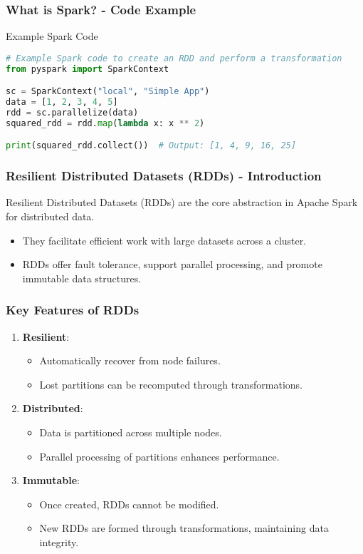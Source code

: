\documentclass[aspectratio=169]{beamer}
\begin{document}
\begin{frame}[fragile]
    \frametitle{What is Spark? - Code Example}
    \begin{block}{Example Spark Code}
        \begin{lstlisting}[language=Python]
# Example Spark code to create an RDD and perform a transformation
from pyspark import SparkContext

sc = SparkContext("local", "Simple App")
data = [1, 2, 3, 4, 5]
rdd = sc.parallelize(data)
squared_rdd = rdd.map(lambda x: x ** 2)

print(squared_rdd.collect())  # Output: [1, 4, 9, 16, 25]
        \end{lstlisting}
    \end{block}
\end{frame}

\begin{frame}[fragile]
    \frametitle{Resilient Distributed Datasets (RDDs) - Introduction}
    Resilient Distributed Datasets (RDDs) are the core abstraction in Apache Spark for distributed data. 
    \begin{itemize}
        \item They facilitate efficient work with large datasets across a cluster.
        \item RDDs offer fault tolerance, support parallel processing, and promote immutable data structures.
    \end{itemize}
\end{frame}

\begin{frame}[fragile]
    \frametitle{Key Features of RDDs}
    \begin{enumerate}
        \item \textbf{Resilient}:
            \begin{itemize}
                \item Automatically recover from node failures.
                \item Lost partitions can be recomputed through transformations.
            \end{itemize}
        
        \item \textbf{Distributed}:
            \begin{itemize}
                \item Data is partitioned across multiple nodes.
                \item Parallel processing of partitions enhances performance.
            \end{itemize}
        
        \item \textbf{Immutable}:
            \begin{itemize}
                \item Once created, RDDs cannot be modified.
                \item New RDDs are formed through transformations, maintaining data integrity.
            \end{itemize}
    \end{enumerate}
\end{frame}
\end{document}
